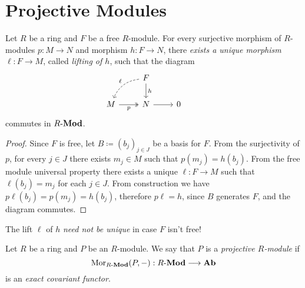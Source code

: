 \section{Projective Modules}

\begin{theorem}
\label{thm:free-modules-are-projective}
Let \(R\) be a ring and \(F\) be a free \(R\)-module. For every surjective
morphism of \(R\)-modules \(p: M \to N\) and morphism \(h: F \to N\), there
\emph{exists a unique morphism} \(\ell: F \to M\), called \emph{lifting of
  \(h\)}, such that the diagram
\[
\begin{tikzcd}
&F \ar[d, "h"] \ar[dl, bend right, dashed, "\ell"'] & & \\
M \ar[r, two heads, "p"'] &N \ar[r] &0
\end{tikzcd}
\]
commutes in \({R\text{-}\textbf{Mod}}\).
\end{theorem}

\begin{proof}
Since \(F\) is free, let \(B \coloneq (b_j)_{j \in J}\) be a basis for
\(F\). From the surjectivity of \(p\), for every \(j \in J\) there exists
\(m_j \in M\) such that \(p(m_j) = h(b_j)\). From the free module universal
property there exists a unique \(\ell: F \to M\) such that \(\ell(b_j) = m_j\)
for each \(j \in J\). From construction we have
\(p \ell(b_j) = p(m_j) = h(b_j)\), therefore \(p \ell = h\), since \(B\)
generates \(F\), and the diagram commutes.
\end{proof}

\begin{remark}
\label{rem:uniqueness-of-lifting}
The lift \(\ell\) of \(h\) \emph{need not be unique} in case \(F\) isn't free!
\end{remark}

\begin{definition}
\label{def:projective-module}
Let \(R\) be a ring and \(P\) be an \(R\)-module. We say that \(P\) is a
\emph{projective \(R\)-module} if
\[
\operatorname{Mor}_{{R\text{-}\textbf{Mod}}}(P, -): {R\text{-}\textbf{Mod}} \longrightarrow {\textbf{Ab}}
\]
is an \emph{exact covariant functor}.
\end{definition}


